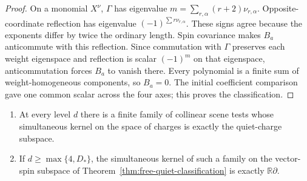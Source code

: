 \begin{proof}
On a monomial $X^\nu$, $\Gamma$ has eigenvalue
$m=\sum_{r,\alpha}(r+2)\nu_{r,\alpha}$.  Opposite-coordinate reflection
has eigenvalue $(-1)^{\sum r\nu_{r,\alpha}}$.  These signs agree because
the exponents differ by twice the ordinary length.  Spin covariance makes
$B_a$ anticommute with this reflection.  Since commutation with $\Gamma$
preserves each weight eigenspace and reflection is scalar $(-1)^m$ on that
eigenspace, anticommutation forces $B_a$ to vanish there.  Every polynomial
is a finite sum of weight-homogeneous components, so $B_a=0$.  The initial
coefficient comparison gave one common scalar across the four axes; this
proves the classification.
\end{proof}

\begin{theorem}
\label{thm:free-collinear-scenes}
\begin{enumerate}
\item At every level $d$ there is a finite family of collinear scene
  tests whose simultaneous kernel on the space of charges is exactly the
  quiet-charge subspace.
\item If $d\geq\max\{4,D_*\}$, the simultaneous kernel of such a family on
  the vector-spin subspace of Theorem~\ref{thm:free-quiet-classification}
  is exactly $\mathbb R\partial$.
\end{enumerate}
\end{theorem}

